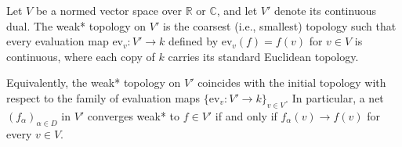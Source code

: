 \begin{proposition} \label{proposition:weak_star_topology_is_coarsest_making_evaluations_continuous}
    Let $V$ be a normed vector space over $\mathbb{R}$ or $\mathbb{C}$, and let $V'$ denote its continuous dual. The weak* topology on $V'$ is the coarsest (i.e., smallest) topology such that every evaluation map $\mathrm{ev}_v : V' \to k$ defined by $\mathrm{ev}_v(f) = f(v)$ for $v \in V$ is continuous, where each copy of $k$ carries its standard Euclidean topology.

    Equivalently, the weak* topology on $V'$ coincides with the initial topology with respect to the family of evaluation maps $\{\mathrm{ev}_v : V' \to k\}_{v \in V}$. In particular, a net $(f_\alpha)_{\alpha \in D}$ in $V'$ converges weak* to $f \in V'$ if and only if $f_\alpha(v) \to f(v)$ for every $v \in V$.
\end{proposition}

